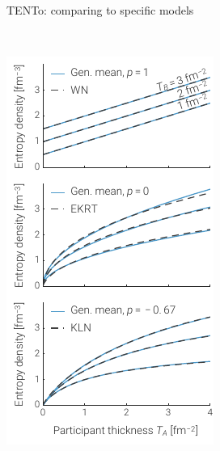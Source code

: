 \documentclass[aspectratio=43]{beamer}
\theoremstyle{definition}
\newcommand{\trento}{T\raisebox{-0.3ex}{R}ENTo}
\begin{document}
\begin{frame}[t]{\trento: comparing to specific models}
  \begin{columns}
    \begin{column}{.4\textwidth}
      \centering
      \vspace{0.3 cm}\\
      \includegraphics[width=.95\columnwidth]{cgc_compare}
    \end{column}
    \begin{column}{.6\textwidth}

\end{column}
\end{columns}
\end{frame}
\end{document}
